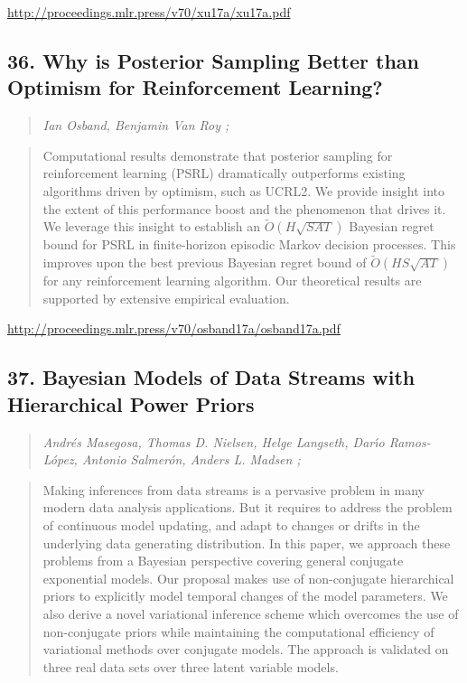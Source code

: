 \documentclass{article}
\begin{document}
\href{http://proceedings.mlr.press/v70/xu17a/xu17a.pdf}{http://proceedings.mlr.press/v70/xu17a/xu17a.pdf}

\subsection{36. Why is Posterior Sampling Better than Optimism for Reinforcement Learning?}

\begin{quote}
\footnotesize{\textit{Ian Osband, Benjamin Van Roy ;}}

\end{quote}

\begin{quote}
    Computational results demonstrate that posterior sampling for reinforcement learning (PSRL) dramatically outperforms existing algorithms driven by optimism, such as UCRL2. We provide insight into the extent of this performance boost and the phenomenon that drives it. We leverage this insight to establish an $\tilde{O}(H\sqrt{SAT})$ Bayesian regret bound for PSRL in finite-horizon episodic Markov decision processes. This improves upon the best previous Bayesian regret bound of $\tilde{O}(H S \sqrt{AT})$ for any reinforcement learning algorithm. Our theoretical results are supported by extensive empirical evaluation.  
\end{quote}

\href{http://proceedings.mlr.press/v70/osband17a/osband17a.pdf}{http://proceedings.mlr.press/v70/osband17a/osband17a.pdf}

\subsection{37. Bayesian Models of Data Streams with Hierarchical Power Priors}

\begin{quote}
\footnotesize{\textit{Andrés Masegosa, Thomas D. Nielsen, Helge Langseth, Darı́o Ramos-López, Antonio Salmerón, Anders L. Madsen ;}}

\end{quote}

\begin{quote}
    Making inferences from data streams is a pervasive problem in many modern data analysis applications. But it requires to address the problem of continuous model updating, and adapt to changes or drifts in the underlying data generating distribution. In this paper, we approach these problems from a Bayesian perspective covering general conjugate exponential models. Our proposal makes use of non-conjugate hierarchical priors to explicitly model temporal changes of the model parameters. We also derive a novel variational inference scheme which overcomes the use of non-conjugate priors while maintaining the computational efficiency of variational methods over conjugate models. The approach is validated on three real data sets over three latent variable models.  
\end{quote}
\end{document}
